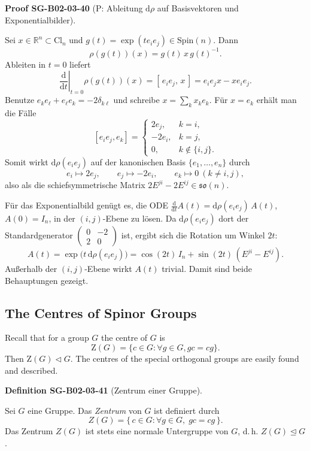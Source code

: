 \documentclass[10pt, letterpaper]{article}
\newcommand{\R}{\mathbb{R}}
\newcommand{\Cl}{\mathrm{Cl}}
\newcommand{\Spin}{\mathrm{Spin}}
\newcommand{\CustomHeading}[3]{%
  \par\medskip\noindent%
  \textbf{#1 #2} \textnormal{(#3)}.\enskip%
}
\newenvironment{DEF}[2]{\begin{unitbox}\CustomHeading{Definition}{#1}{#2}}{\end{unitbox}}
\newenvironment{PROOF}[2]{\begin{unitbox}\CustomHeading{Proof}{#1}{#2}}{\end{unitbox}}
\begin{document}
\begin{PROOF}{SG-B02-03-40}{P: Ableitung \(\mathrm d\rho\) auf Basisvektoren und Exponentialbilder}
Sei \(x\in\R^n\subset\Cl_n\) und \(g(t)=\exp(te_ie_j)\in\Spin(n)\). Dann
\[
\rho(g(t))(x)=g(t)\,x\,g(t)^{-1}.
\]
Ableiten in \(t=0\) liefert
\[
\left.\frac{\mathrm d}{\mathrm dt}\right|_{t=0}\rho(g(t))(x)
=\left.[\,e_i e_j,\,x\,]\right.
= e_i e_j x- x e_i e_j.
\]
Benutze \(e_k e_\ell+e_\ell e_k=-2\delta_{k\ell}\) und schreibe \(x=\sum_{k}x_k e_k\).
Für \(x=e_k\) erhält man die Fälle
\[
[e_i e_j,e_k]=
\begin{cases}
2e_j, & k=i,\\[2pt]
-2e_i,& k=j,\\[2pt]
0,& k\notin\{i,j\}.
\end{cases}
\]
Somit wirkt \(\mathrm d\rho(e_i e_j)\) auf der kanonischen Basis \(\{e_1,\dots,e_n\}\) durch
\[
e_i\mapsto 2e_j,\qquad e_j\mapsto -2e_i,\qquad e_k\mapsto 0\ (k\ne i,j),
\]
also als die schiefsymmetrische Matrix \(2E^{ji}-2E^{ij}\in\mathfrak{so}(n)\).

Für das Exponentialbild genügt es, die ODE
\(\frac{\mathrm d}{\mathrm dt}A(t)=\mathrm d\rho(e_i e_j)\,A(t)\), \(A(0)=I_n\),
in der \((i,j)\)-Ebene zu lösen. Da \(\mathrm d\rho(e_i e_j)\) dort der Standardgenerator
\(\begin{pmatrix}0&-2\\ 2&0\end{pmatrix}\) ist, ergibt sich die Rotation um Winkel \(2t\):
\[
A(t)=\exp\!\big(t\,\mathrm d\rho(e_i e_j)\big)
=\cos(2t)\,I_n+\sin(2t)\,(E^{ji}-E^{ij}).
\]
Außerhalb der \((i,j)\)-Ebene wirkt \(A(t)\) trivial. Damit sind beide Behauptungen gezeigt.
\end{PROOF}



\pagebreak


\subsection{The Centres of Spinor Groups}


Recall that for a group $G$ the centre of $G$ is
$$
\mathrm{Z}(G)=\{c \in G: \forall g \in G, g c=c g\} .
$$
Then $\mathrm{Z}(G) \triangleleft G$. The centres of the special orthogonal groups are easily found and described.


\begin{DEF}{SG-B02-03-41}{Zentrum einer Gruppe}
Sei \(G\) eine Gruppe. Das \emph{Zentrum} von \(G\) ist definiert durch
\[
Z(G)=\{\,c\in G:\forall g\in G,\; gc=cg\,\}.
\]
Das Zentrum \(Z(G)\) ist stets eine normale Untergruppe von \(G\),
d.\,h. \(Z(G)\trianglelefteq G\).
\end{DEF}
\end{document}
